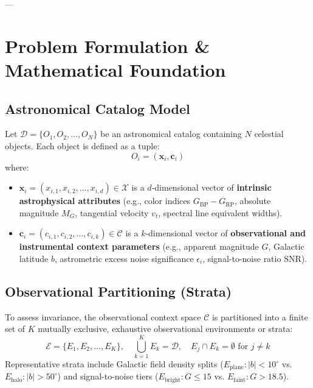 \documentclass[10pt,a4paper]{article}
\begin{document}
---

\section{Problem Formulation \& Mathematical Foundation}
\label{sec:formulation}

\subsection{Astronomical Catalog Model}
Let $\mathcal{D} = \{O_1, O_2, \dots, O_N\}$ be an astronomical catalog containing $N$ celestial objects. Each object is defined as a tuple:
\begin{equation}
    O_i = (\mathbf{x}_i, \mathbf{c}_i)
\end{equation}
where:
\begin{itemize}
    \item $\mathbf{x}_i = (x_{i,1}, x_{i,2}, \dots, x_{i,d}) \in \mathcal{X}$ is a $d$-dimensional vector of \textbf{intrinsic astrophysical attributes} (e.g., color indices $G_{\text{BP}} - G_{\text{RP}}$, absolute magnitude $M_G$, tangential velocity $v_t$, spectral line equivalent widths).
    \item $\mathbf{c}_i = (c_{i,1}, c_{i,2}, \dots, c_{i,k}) \in \mathcal{C}$ is a $k$-dimensional vector of \textbf{observational and instrumental context parameters} (e.g., apparent magnitude $G$, Galactic latitude $b$, astrometric excess noise significance $\epsilon_i$, signal-to-noise ratio $\text{SNR}$).
\end{itemize}

\subsection{Observational Partitioning (Strata)}
To assess invariance, the observational context space $\mathcal{C}$ is partitioned into a finite set of $K$ mutually exclusive, exhaustive observational environments or strata:
\begin{equation}
    \mathcal{E} = \{E_1, E_2, \dots, E_K\}, \quad \bigcup_{k=1}^K E_k = \mathcal{D}, \quad E_j \cap E_k = \emptyset \text{ for } j \neq k
\end{equation}
Representative strata include Galactic field density splits ($E_{\text{plane}}: |b| < 10^\circ$ vs. $E_{\text{halo}}: |b| > 50^\circ$) and signal-to-noise tiers ($E_{\text{bright}}: G \le 15$ vs. $E_{\text{faint}}: G > 18.5$).
\end{document}
